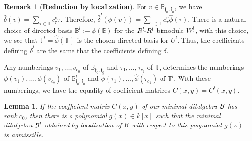 \documentclass{article}
\newtheorem{lemma}[theorem]{Lemma}
\theoremstyle{definition}
\newtheorem{remark}[theorem]{Remark}
\renewcommand{\frak}{\mathfrak}
\newcommand{\g}{\hbox{-}}
\newcommand{\hueca}[1]{\mathbb{#1}}
\begin{document}
\begin{remark}[\bf Reduction by localization]
For $v\in \hueca{B}_{\frak{f}_0,\frak{f}_0}$, we have $\hat{\delta}(v)=\sum_{\tau\in \hueca{T}}c_\tau^v\tau$. Therefore,  
$\hat{\delta}^l(\phi(v))=\sum_{\tau\in \hueca{T}}c^v_\tau\hat{\phi}(\tau)$. There is a natural choice of directed basis $\hueca{B}^l:=\phi(\hueca{B})$ for the $R^l\g R^l$-bimodule $W_1^l$, with this choice, we see that $\hueca{T}^l=\hat{\phi}(\hueca{T})$ is the chosen directed basis for $U^l$. Thus, the  coefficients defining $\hat{\delta}^l$ are the same that the coefficients defining $\hat{\delta}$.   

Any numberings $v_1,\ldots,v_{c_0}$ of $\hueca{B}_{\frak{f}_0,\frak{f}_0}$ and $\tau_1,\ldots,\tau_{c_1}$ of $\hueca{T}$, determines the numberings $\phi(v_1),\ldots,\phi(v_{c_0})$ of $\hueca{B}^l_{\frak{f}_0,\frak{f}_0}$ and $\hat{\phi}(\tau_1),\ldots,\hat{\phi}(\tau_{c_1})$ of $\hueca{T}^l$. With these numberings, we have the equality of coefficient matrices $C(x,y)=C^l(x,y)$.  
\end{remark}

\begin{lemma}\label{L: triangulacion de C}
If the coefficient matrix $C(x,y)$ of our minimal ditalgebra ${\cal B}$ has rank $c_0$, then there is a polynomial $g(x)\in k[x]$ such that the minimal ditalgebra ${\cal B}^l$ obtained by localization of ${\cal B}$ with respect to this polynomial $g(x)$ is admissible. 
\end{lemma}
\end{document}
